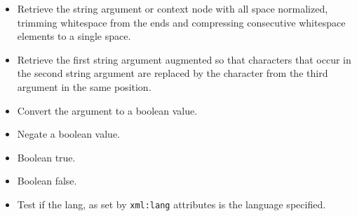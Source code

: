 \documentclass[20pt,landscape,headrule,footrule]{foils}
\begin{document}
\begin{minipage}{\textwidth}
\small
\begin{itemize}
  \item {}
    Retrieve the string argument or context node with all space
    normalized, trimming whitespace from the ends and compressing
    consecutive whitespace elements to a single space.
  \item {}
    Retrieve the first string argument augmented so that characters
    that occur in the second string argument are replaced by the
    character from the third argument in the same position.
    
\end{itemize}
\end{minipage}


\begin{minipage}{\textwidth}
\small
\begin{itemize}
  \item {}
    Convert the argument to a boolean value.
  \item {}
    Negate a boolean value.
  \item {}
    Boolean true.
  \item {}
    Boolean false.
  \item {}
    Test if the lang, as set by \verb|xml:lang| attributes is
    the language specified.
\end{itemize}
\end{minipage}

\end{document}

